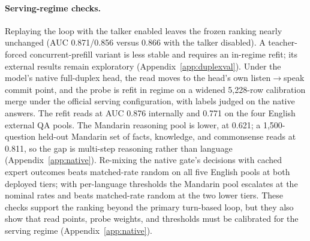 \paragraph{Serving-regime checks.}
Replaying the loop with the talker enabled leaves the frozen ranking
nearly unchanged (AUC 0.871/0.856 versus 0.866 with the talker
disabled). A teacher-forced concurrent-prefill variant is less stable
and requires an in-regime refit; its external results remain
exploratory (Appendix~\ref{app:duplexval}). Under the model's native
full-duplex head, the read moves to the head's own listen$\to$speak
commit point, and the probe is refit in regime on a widened
5{,}228-row calibration merge under the official serving
configuration, with labels judged on the native answers. The refit
reads at AUC 0.876 internally and 0.771 on the four English external
QA pools. The Mandarin reasoning pool is lower, at 0.621; a
1{,}500-question held-out Mandarin set of facts, knowledge, and
commonsense reads at 0.811, so the gap is multi-step reasoning
rather than language (Appendix~\ref{app:native}). Re-mixing the
native gate's decisions with cached expert outcomes beats
matched-rate random on all five English pools at both deployed
tiers; with per-language thresholds the Mandarin pool escalates at
the nominal rates and beats matched-rate random at the two lower
tiers. These checks support the ranking beyond the primary
turn-based loop, but they also show that read points, probe weights,
and thresholds must be calibrated for the serving regime
(Appendix~\ref{app:native}).

